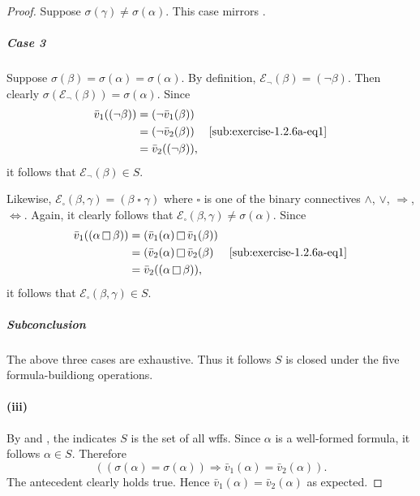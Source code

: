 \documentclass{report}
\begin{document}
\begin{proof}
        Suppose $\sigma(\gamma) \neq \sigma(\alpha)$.
        This case mirrors .

      \subparagraph{Case 3}%

        Suppose $\sigma(\beta) = \sigma(\alpha) = \sigma(\alpha)$.
        By definition, $\mathcal{E}_{\neg}(\beta) = (\neg\beta)$.
        Then clearly $\sigma(\mathcal{E}_{\neg}(\beta)) = \sigma(\alpha)$.
        Since
          \begin{align*}
            \bar{v}_1((\neg\beta))
              & = (\neg\bar{v}_1(\beta)) \\
              & = (\neg\bar{v}_2(\beta)) & \eqref{sub:exercise-1.2.6a-eq1} \\
              & = \bar{v}_2((\neg\beta)),
          \end{align*}
          it follows that $\mathcal{E}_{\neg}(\beta) \in S$.

        Likewise,
          $\mathcal{E}_{\square}(\beta, \gamma) =
            (\beta \mathop{\square} \gamma)$
          where $\square$ is one of the binary connectives $\land$, $\lor$,
            $\Rightarrow$, $\Leftrightarrow$.
        Again, it clearly follows that
          $\mathcal{E}_{\square}(\beta, \gamma) \neq \sigma(\alpha)$.
        Since
          \begin{align*}
            \bar{v}_1((\alpha \mathop{\square} \beta))
              & = (\bar{v}_1(\alpha) \mathop{\square} \bar{v}_1(\beta)) \\
              & = (\bar{v}_2(\alpha) \mathop{\square} \bar{v}_2(\beta)
                & \eqref{sub:exercise-1.2.6a-eq1} \\
              & = \bar{v}_2((\alpha \mathop{\square} \beta)),
          \end{align*}
          it follows that $\mathcal{E}_{\square}(\beta, \gamma) \in S$.

      \subparagraph{Subconclusion}%

        The above three cases are exhaustive.
        Thus it follows $S$ is closed under the five formula-buildiong
          operations.

    \paragraph{(iii)}%

      By  and ,
        the  indicates $S$ is the set of all
        wffs.
      Since $\alpha$ is a well-formed formula, it follows $\alpha \in S$.
      Therefore
        $$((\sigma(\alpha) = \sigma(\alpha)) \Rightarrow
          \bar{v}_1(\alpha) = \bar{v}_2(\alpha)).$$
      The antecedent clearly holds true.
      Hence $\bar{v}_1(\alpha) = \bar{v}_2(\alpha)$ as expected.

  \end{proof}
\end{document}
